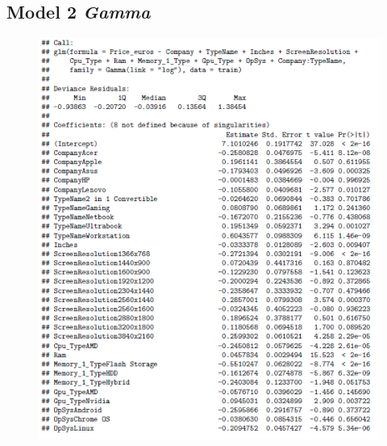 \documentclass[12pt]{article}
\begin{document}
\subsection{Model 2 \textit{Gamma}}
\label{Model_2_Gamma}
\begin{figure}[h!]
    \centering
    \includegraphics{Model_3_Sum(1_3).png}
    \label{fig:SUM31}
\end{figure}
\end{document}
